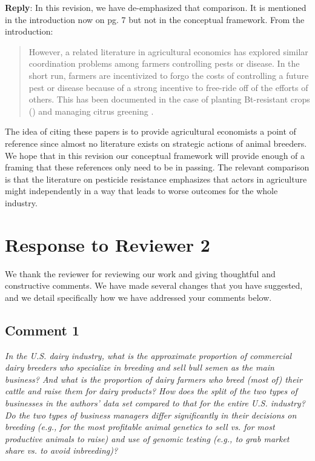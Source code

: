 \documentclass[12pt,letterpaper]{article}
\begin{document}
\textbf{Reply}: In this revision, we have de-emphasized that comparison. It is mentioned in the introduction now on pg. 7 but not in the conceptual framework. From the introduction:

\begin{quote}
However, a related literature in agricultural economics has explored similar coordination problems among farmers controlling pests or disease.
In the short run, farmers are incentivized to forgo the costs of controlling a future pest or disease because of a strong incentive to free-ride off of the efforts of others.
This has been documented in the case of planting Bt-resistant crops (\cite{epanchin2015individual,brown2018voluntary,wechsler2018has,livingston2004managing}) and managing citrus greening \cite{lence2023does}. 
\end{quote}

The idea of citing these papers is to provide agricultural economists a point of reference since almost no literature exists on strategic actions of animal breeders.
We hope that in this revision our conceptual framework will provide enough of a framing that these references only need to be in passing.
The relevant comparison is that the literature on pesticide resistance emphasizes that actors in agriculture might independently in a way that leads to worse outcomes for the whole industry.

%
%
\printbibliography[title={References 1}]

\newrefsection
\newpage
\noindent \section*{Response to Reviewer 2} 
\noindent We thank the reviewer for reviewing our work and giving thoughtful and constructive comments. We have made several changes that you have suggested, and we detail specifically how we have addressed your comments below.

\subsection*{Comment 1}
{\it In the U.S. dairy industry, what is the approximate proportion of commercial dairy breeders who specialize in breeding and sell bull semen as the main business? And what is the proportion of dairy farmers who breed (most of) their cattle and raise them for dairy products? How does the split of the two types of businesses in the authors’ data set compared to that for the entire U.S. industry? Do the two types of business managers
differ significantly in their decisions on breeding (e.g., for the most profitable animal genetics to sell vs. for most productive animals to raise) and use of genomic testing (e.g., to grab market share vs. to avoid inbreeding)?} \\
\end{document}
